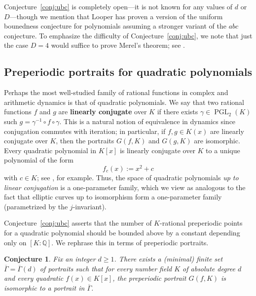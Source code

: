 \documentclass[12pt]{amsart}
\newtheorem{conj}[thm]{Conjecture}
\theoremstyle{definition}
\newcommand{\bbQ}{\mathbb{Q}}
\newcommand{\Gammabar}{\overline{\Gamma}}
\newcommand{\PGL}{\operatorname{PGL}}
\numberwithin{equation}{section}
\begin{document}
Conjecture~\ref{conj:ubc} is completely open---it is not known for any values of $d$ or $D$---though we mention that Looper \cite{looper:2021, looper} has proven a version of the uniform bounedness conjecture for polynomials assuming a stronger variant of the $abc$ conjecture. To emphasize the difficulty of Conjecture~\ref{conj:ubc}, we note that just the case $D = 4$ would suffice to prove Merel's theorem; see \cite[]{silverman:2007}.

\subsection{Preperiodic portraits for quadratic polynomials}

Perhaps the most well-studied family of rational functions in complex and arithmetic dynamics is that of quadratic polynomials. We say that two rational functions $f$ and $g$ are {\bf linearly conjugate} over $K$ if there exists $\gamma \in \PGL_2(K)$ such $g = \gamma^{-1}\circ f\circ\gamma$. This is a natural notion of equivalence in dynamics since conjugation commutes with iteration; in particular, if $f,g \in K(x)$ are linearly conjugate over $K$, then the portraits $G(f,K)$ and $G(g,K)$ are isomorphic. Every quadratic polynomial in $K[x]$ is linearly conjugate over $K$ to a unique polynomial of the form
    \[
    f_c(x) := x^2 + c
    \]
with $c \in K$; see \cite[]{silverman:2007}, for example. Thus, the space of quadratic polynomials \emph{up to linear conjugation} is a one-parameter family, which we view as analogous to the fact that elliptic curves up to isomorphism form a one-parameter family (parametrized by the $j$-invariant).

Conjecture~\ref{conj:ubc} asserts that the number of $K$-rational preperiodic points for a quadratic polynomial should be bounded above by a constant depending only on $[K:\bbQ]$. We rephrase this in terms of preperiodic portraits.

\begin{conj}\label{conj:ubc-classification}
Fix an integer $d \ge 1$. There exists a (minimal) finite set $\Gammabar = \Gammabar(d)$ of portraits such that for every number field $K$ of absolute degree $d$ and every quadratic $f(x) \in K[x]$, the preperiodic portrait $G(f,K)$ is isomorphic to a portrait in $\Gammabar$.
\end{conj}
\end{document}
